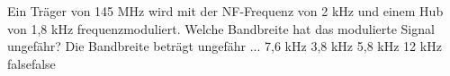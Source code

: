     {Ein Träger von 145 MHz wird mit der NF-Frequenz von 2 kHz und einem Hub von 1,8 kHz frequenzmoduliert. Welche Bandbreite hat das modulierte Signal ungefähr? Die Bandbreite beträgt ungefähr ...}
    {7,6 kHz}
    {3,8 kHz}
    {5,8 kHz}
    {12 kHz}
    {false}{false}